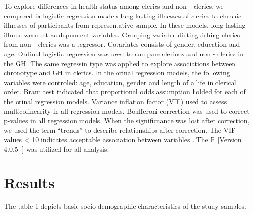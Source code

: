 \documentclass[ijerph,article,accept,moreauthors,pdftex]{mdpi}
\begin{document}
To explore differences in health status among clerics and non - clerics,
we compared in logistic regression models long lasting illnesses of
clerics to chronic illnesses of participants from representative sample.
In these models, long lasting illness were set as dependent variables.
Grouping variable distinguishing clerics from non - clerics was a
regressor. Covariates consists of gender, education and age. Ordinal
logistic regression was used to compare clerincs and non - clerics in
the GH. The same regressin type was applied to explore associations
between chronotype and GH in clerics. In the orinal regression models,
the following variables were controled: age, education, gender and
length of a life in clerical order. Brant test indicated that
proportional odds assumption holded for each of the orinal regression
models. Variance inflation factor (VIF) used to assess multicolinearity
in all regression models. Bonfferoni correction was used to correct
p-values in all regression models. When the significnance was lost after
correction, we used the term ``trends'' to describe relationships after
correction. The VIF values \textless{} 10 indicates acceptable
association between variables \citep{TAY2017}. The R {[}Version 4.0.5;
\citet{R-base}{]} was utilized for all analysis.

\hypertarget{results}{%
\section{Results}\label{results}}

The table 1 depicts basic socio-demographic characteristics of the study
samples.

\newpage
\end{document}
